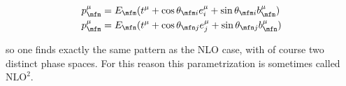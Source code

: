 \documentclass[11pt]{report}
\begin{document}
\begin{align}
    &p^\mu_\mfm = E_\mfm(t^\mu + \cos\theta_{\mfm i}e^\mu_i +\sin\theta_{\mfm i}b^\mu_\mfm) \notag \\ 
    &p^\mu_\mfm = E_\mfn(t^\mu + \cos\theta_{\mfn j}e^\mu_j +\sin\theta_{\mfn j}b^\mu_\mfn) 
\end{align}

so one finds exactly the same pattern as the NLO case, with of course two distinct phase spaces. For this reason this parametrization is sometimes called \(\text{NLO}^2\). 
\end{document}

